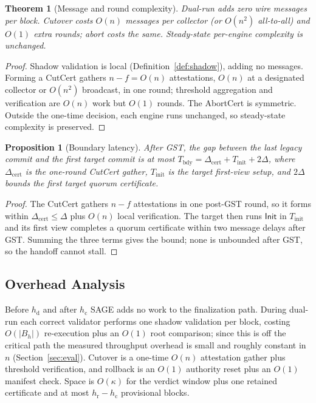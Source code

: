 \documentclass[journal]{IEEEtran}
\newtheorem{theorem}{Theorem}
\newtheorem{proposition}{Proposition}
\begin{document}
\begin{theorem}[Message and round complexity]
\label{th:complexity}
Dual-run adds zero wire messages per block. Cutover costs $O(n)$ messages per collector (or
$O(n^2)$ all-to-all) and $O(1)$ extra rounds; abort costs the same. Steady-state per-engine
complexity is unchanged.
\end{theorem}
\begin{proof}
Shadow validation is local (Definition~\ref{def:shadow}), adding no messages. Forming a CutCert
gathers $n-f=O(n)$ attestations, $O(n)$ at a designated collector or $O(n^2)$ broadcast, in one
round; threshold aggregation and verification are $O(n)$ work but $O(1)$ rounds. The AbortCert is
symmetric. Outside the one-time decision, each engine runs unchanged, so steady-state complexity
is preserved.
\end{proof}

\begin{proposition}[Boundary latency]
\label{prop:bdy}
After GST, the gap between the last legacy commit and the first target commit is at most
$T_{\mathrm{bdy}} = \Delta_{\mathrm{cert}} + T_{\mathrm{init}} + 2\Delta$, where
$\Delta_{\mathrm{cert}}$ is the one-round CutCert gather, $T_{\mathrm{init}}$ is the target
first-view setup, and $2\Delta$ bounds the first target quorum certificate.
\end{proposition}
\begin{proof}
The CutCert gathers $n-f$ attestations in one post-GST round, so it forms within
$\Delta_{\mathrm{cert}}\le\Delta$ plus $O(n)$ local verification. The target then runs
$\mathsf{Init}$ in $T_{\mathrm{init}}$ and its first view completes a quorum certificate within
two message delays after GST. Summing the three terms gives the bound; none is unbounded after
GST, so the handoff cannot stall.
\end{proof}

\subsection{Overhead Analysis}
Before $h_{\mathrm{d}}$ and after $h_{\mathrm{c}}$ SAGE adds no work to the finalization path.
During dual-run each correct validator performs one shadow validation per block, costing
$O(|B_h|)$ re-execution plus an $O(1)$ root comparison; since this is off the critical path the
measured throughput overhead is small and roughly constant in $n$ (Section~\ref{sec:eval}).
Cutover is a one-time $O(n)$ attestation gather plus threshold verification, and rollback is an
$O(1)$ authority reset plus an $O(1)$ manifest check. Space is $O(\kappa)$ for the verdict window
plus one retained certificate and at most $h_{\mathrm{r}}-h_{\mathrm{c}}$ provisional blocks.
\end{document}
